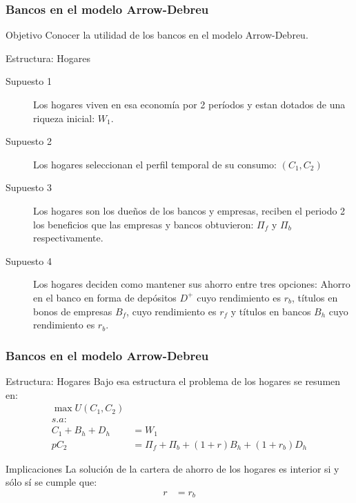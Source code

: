 \documentclass[10pt, xcolor=table, x11names]{beamer}
\begin{document}
\begin{frame}
    \frametitle{{\normalsize Bancos en el modelo Arrow-Debreu} {}}
   \begin{block} {Objetivo}
       Conocer la utilidad de los bancos en el modelo Arrow-Debreu. 	
   \end{block}	
   \begin{block} {Estructura: Hogares}
       \begin{description}
           \item[Supuesto 1] Los hogares viven en esa economía por 2 períodos y estan dotados de una riqueza inicial: $W_{1}$.
           \item[Supuesto 2] Los hogares seleccionan el perfil temporal de su consumo: $(C_{1}, C_{2})$
           \item[Supuesto 3] Los hogares son los dueños de los bancos y empresas, reciben el periodo 2 los beneficios que las empresas y bancos obtuvieron: $\Pi_{f}$ y $\Pi_{b}$ respectivamente. 
           \item[Supuesto 4] Los hogares deciden como mantener sus ahorro entre tres opciones: Ahorro en el banco en forma  de depósitos $D^{+}$ cuyo rendimiento es $r_{b}$, títulos en bonos de empresas $B_{f} $, cuyo rendimiento es $r_{f} $ y títulos en bancos $B_{h}$ cuyo rendimiento es $r_{b}$. 	
          \end{description}
     
   \end{block}	
\end{frame}



\begin{frame}
    \frametitle{{\normalsize Bancos en el modelo Arrow-Debreu} {}}
    
    \begin{block} {Estructura: Hogares} 
     Bajo esa estructura el problema de los hogares se resumen en:
    \begin{align}
    \max U(C_{1},C_{2})\nonumber \\
    s.a:\nonumber\\
    C_{1}+B_{h}+D_{h}&=W_{1}\nonumber\\      pC_{2}&=\Pi_{f}+\Pi_{b}+(1+r)B_{h}+(1+r_{b})D_{h}\nonumber
    \end{align}
    \end{block}
      \begin{block} {Implicaciones}
        La solución de la cartera de ahorro de los hogares es interior si y sólo sí se cumple que:
        \begin{align}
        r&=r_{b}
        \end{align} 	
       
    \end{block}	

\end{frame}
\end{document}
